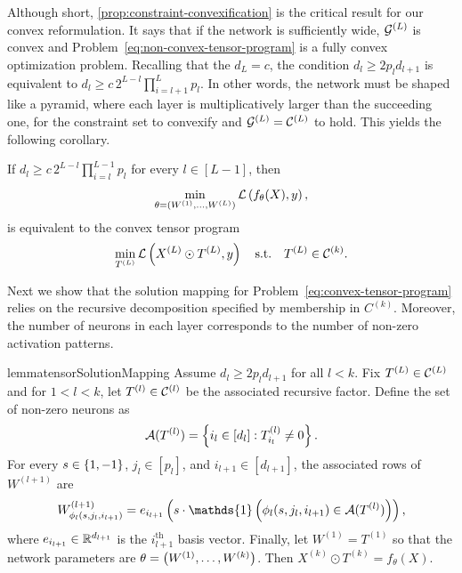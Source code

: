 Although short, \cref{prop:constraint-convexification} is the critical
result for our convex reformulation.
It says that if the network is sufficiently wide, \( \mathcal{G}^{(L)} \) is convex and
Problem~\ref{eq:non-convex-tensor-program} is a fully convex optimization
problem.
Recalling that the \( d_L = c \), the condition \( d_l \geq 2 p_l d_{l+1} \)
is equivalent to \( d_l \geq c \, 2^{L-l} \prod_{i = l+1}^{L} p_l \).
In other words, the network must be shaped like a pyramid, where each
layer is multiplicatively larger than the succeeding one,
for the constraint set to convexify and \( \mathcal{G}^{(L)} = \mathcal{C}^{(L)} \) to hold.
This yields the following corollary.
\begin{corollary}\label{cor:convex-tensor-program}
    If \( d_l \geq c \, 2^{L-l} \prod_{i = l}^{L-1} p_l \) for every
    \( l \in [L-1]  \), then
    \begin{equation*}
        \min_{\theta = (W^{(1)}, \ldots, W^{(L)})} \mathcal{L}\left(f_{\theta}(X), y\right),
    \end{equation*}
    is equivalent to the convex tensor program
    \begin{equation}\label{eq:convex-tensor-program}
        \min_{T^{(L)}}
        \mathcal{L}\left(X^{(L)} \odot T^{(L)}, y\right) \quad \text{s.t.} \quad
        T^{(L)} \in \mathcal{C}^{(k)}.
    \end{equation}
\end{corollary}

Next we show that the solution mapping for Problem~\ref{eq:convex-tensor-program}
relies on the recursive decomposition specified by membership in \( C^{(k)} \).
Moreover, the number of neurons in each layer corresponds to the number of
non-zero activation patterns.

\begin{restatable}{lemma}{tensorSolutionMapping}%
    \label{lemma:convex-tensor-solution-mapping}
    Assume \( d_l \geq 2 p_l d_{l+1} \) for all \( l < k \).
    Fix \( T^{(L)} \in \mathcal{C}^{(L)} \) and for \( 1 < l < k \), let \( T^{(l)} \in \mathcal{C}^{(l)} \)
    be the associated recursive factor.
    Define the set of non-zero neurons as
    \[
        \mathcal{A}(T^{(l)}) = \left\{i_{l} \in [d_l] : T^{(l)}_{i_{l}} \neq 0\right\}.
    \]
    For every \(s \in \left\{1, -1\right\} \), \( j_l \in [p_l] \), and
    \( i_{l+1} \in [d_{l+1}] \), the associated rows of \( W^{(l+1)} \) are
    \[
        W^{(l+1)}_{\phi_l(s, j_l, i_{l+1})}
        = e_{i_{l+1}} \rbr{s \cdot \mathds{1}\rbr{\phi_l(s, j_l, i_{l+1}) \in \calA(\Tl)}},
    \]
    where \( e_{i_{l+1}} \in \mathbb{R}^{d_{l+1}} \) is the \( i_{l+1}^{\text{th}} \)
    basis vector.
    Finally, let \( W^{(1)} = T^{(1)} \)
    so that the network parameters are
    \( \theta = \left(W^{(1)}, \ldots, W^{(k)}\right) \).
    Then \( X^{(k)} \odot T^{(k)} = f_\theta(X) \).
\end{restatable}

